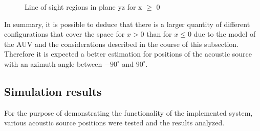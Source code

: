 \begin{figure}[!htbp]
	\captionsetup{justification=centering,margin=2cm}
	\caption{Line of sight regions in plane yz for x $\geq$ 0}
	\label{fig:los-color-b0}
\end{figure}

In summary, it is possible to deduce that there is a larger quantity of different configurations that cover the space for $x>0$ than for $x \leq 0$ due to the model of the AUV and the considerations described in the course of this subsection. Therefore it is expected a better estimation for positions of the acoustic source with an azimuth angle between $-90^{\circ}$ and $90^{\circ}$.

\subsection{Simulation results}

For the purpose of demonstrating the functionality of the implemented system, various acoustic source positions were tested and the results analyzed.

